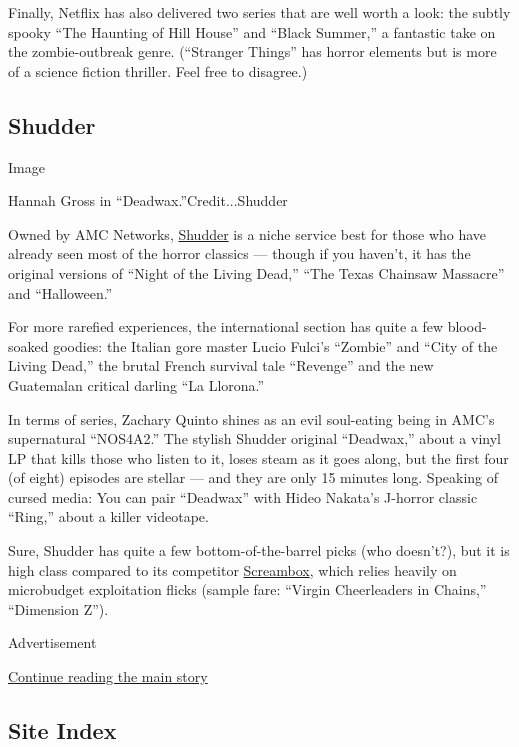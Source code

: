 Finally, Netflix has also delivered two series that are well worth a
look: the subtly spooky ``The Haunting of Hill House'' and ``Black
Summer,'' a fantastic take on the zombie-outbreak genre. (``Stranger
Things'' has horror elements but is more of a science fiction thriller.
Feel free to disagree.)

\hypertarget{shudder}{%
\subsection{Shudder}\label{shudder}}

Image

Hannah Gross in ``Deadwax.''Credit...Shudder

Owned by AMC Networks, \href{https://www.shudder.com/}{Shudder} is a
niche service best for those who have already seen most of the horror
classics --- though if you haven't, it has the original versions of
``Night of the Living Dead,'' ``The Texas Chainsaw Massacre'' and
``Halloween.''

For more rarefied experiences, the international section has quite a few
blood-soaked goodies: the Italian gore master Lucio Fulci's ``Zombie''
and ``City of the Living Dead,'' the brutal French survival tale
``Revenge'' and the new Guatemalan critical darling ``La Llorona.''

In terms of series, Zachary Quinto shines as an evil soul-eating being
in AMC's supernatural ``NOS4A2.'' The stylish Shudder original
``Deadwax,'' about a vinyl LP that kills those who listen to it, loses
steam as it goes along, but the first four (of eight) episodes are
stellar --- and they are only 15 minutes long. Speaking of cursed media:
You can pair ``Deadwax'' with Hideo Nakata's J-horror classic ``Ring,''
about a killer videotape.

Sure, Shudder has quite a few bottom-of-the-barrel picks (who doesn't?),
but it is high class compared to its competitor
\href{https://www.screambox.com/}{Screambox}, which relies heavily on
microbudget exploitation flicks (sample fare: ``Virgin Cheerleaders in
Chains,'' ``Dimension Z'').

Advertisement

\protect\hyperlink{after-bottom}{Continue reading the main story}

\hypertarget{site-index}{%
\subsection{Site Index}\label{site-index}}

